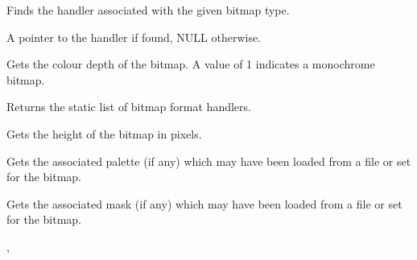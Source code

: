 
Finds the handler associated with the given bitmap type.





A pointer to the handler if found, NULL otherwise.





Gets the colour depth of the bitmap. A value of 1 indicates a
monochrome bitmap.



Returns the static list of bitmap format handlers.



\label{wxbitmapgetheight}


Gets the height of the bitmap in pixels.

\label{wxbitmapgetpalette}


Gets the associated palette (if any) which may have been loaded from a file
or set for the bitmap.



\label{wxbitmapgetmask}


Gets the associated mask (if any) which may have been loaded from a file
or set for the bitmap.


, 

